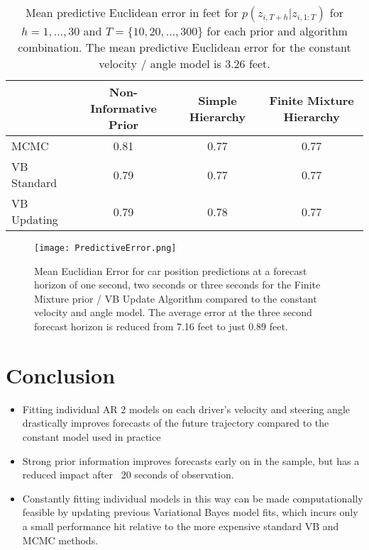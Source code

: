\documentclass[12pt,a4paper]{article}\usepackage[]{graphicx}\usepackage[]{color}
\begin{document}
\begin{center}
\begin{table}[h]
\begin{tabular}{| l | c | c | c |}
\hline
& Non-Informative Prior & Simple Hierarchy & Finite Mixture Hierarchy \\
\hline
MCMC & 0.81 & 0.77 & 0.77 \\
VB Standard & 0.79 & 0.77 & 0.77 \\
VB Updating & 0.79 & 0.78 & 0.77 \\
\hline
\end{tabular}
\label{tableError}
\caption{Mean predictive Euclidean error in feet for $p(z_{i, T+h} | z_{i, 1:T})$ for $h = 1, \dots, 30$ and $T = \{10, 20, \dots, 300\}$ for each prior and algorithm combination. The mean predictive Euclidean error for the constant velocity / angle model is 3.26 feet.}
\end{table}
\end{center}

\begin{figure}[ht]
\centering
\texttt{[image: PredictiveError.png]}
\caption{Mean Euclidian Error for car position predictions at a forecast horizon of one second, two seconds or three seconds for the Finite Mixture prior / VB Update Algorithm compared to the constant velocity and angle model. The average error at the three second forecast horizon is reduced from 7.16 feet to just 0.89 feet.}
\label{fig:MainResults}
\end{figure}

\section{Conclusion}
\begin{itemize}
\item Fitting individual AR 2 models on each driver's velocity and steering angle drastically improves forecasts of the future trajectory compared to the constant model used in practice
\item Strong prior information improves forecasts early on in the sample, but has a reduced impact after ~20 seconds of observation.
\item Constantly fitting individual models in this way can be made computationally feasible by updating previous Variational Bayes model fits, which incurs only a small performance hit relative to the more expensive standard VB and MCMC methods.
\end{itemize}
\end{document}
